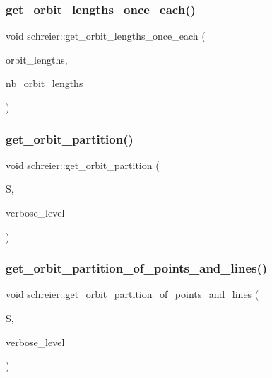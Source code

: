 \subsubsection{\texorpdfstring{get\+\_\+orbit\+\_\+lengths\+\_\+once\+\_\+each()}{get\_orbit\_lengths\_once\_each()}}
{\footnotesize\ttfamily void schreier\+::get\+\_\+orbit\+\_\+lengths\+\_\+once\+\_\+each (\begin{DoxyParamCaption}\item[{\mbox{\hyperlink{galois_8h_a09fddde158a3a20bd2dcadb609de11dc}{I\+NT}} $\ast$\&}]{orbit\+\_\+lengths,  }\item[{\mbox{\hyperlink{galois_8h_a09fddde158a3a20bd2dcadb609de11dc}{I\+NT}} \&}]{nb\+\_\+orbit\+\_\+lengths }\end{DoxyParamCaption})}

\mbox{\label{classschreier_a9d7ef5f2db9c8828ed80f33409810bc3}} 
\subsubsection{\texorpdfstring{get\+\_\+orbit\+\_\+partition()}{get\_orbit\_partition()}}
{\footnotesize\ttfamily void schreier\+::get\+\_\+orbit\+\_\+partition (\begin{DoxyParamCaption}\item[{\mbox{\hyperlink{classpartitionstack}{partitionstack}} \&}]{S,  }\item[{\mbox{\hyperlink{galois_8h_a09fddde158a3a20bd2dcadb609de11dc}{I\+NT}}}]{verbose\+\_\+level }\end{DoxyParamCaption})}

\mbox{\label{classschreier_a21f20632d1ca65c28fb89d53e5cba55a}} 
\subsubsection{\texorpdfstring{get\+\_\+orbit\+\_\+partition\+\_\+of\+\_\+points\+\_\+and\+\_\+lines()}{get\_orbit\_partition\_of\_points\_and\_lines()}}
{\footnotesize\ttfamily void schreier\+::get\+\_\+orbit\+\_\+partition\+\_\+of\+\_\+points\+\_\+and\+\_\+lines (\begin{DoxyParamCaption}\item[{\mbox{\hyperlink{classpartitionstack}{partitionstack}} \&}]{S,  }\item[{\mbox{\hyperlink{galois_8h_a09fddde158a3a20bd2dcadb609de11dc}{I\+NT}}}]{verbose\+\_\+level }\end{DoxyParamCaption})}

